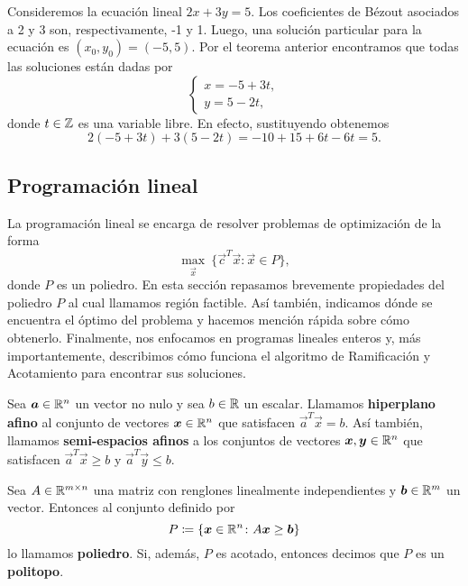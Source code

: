 \begin{example}
	Consideremos la ecuación lineal $2x + 3y = 5$. Los coeficientes de Bézout asociados a 2 y 3 son,
	respectivamente, -1 y 1. Luego, una solución particular para la ecuación es $(x_0, y_0) = (-5, 5)$.
	Por el teorema anterior encontramos que todas las soluciones están dadas por
	\begin{equation*}
		\begin{cases}
			x = -5 + 3t, \\
			y = 5 - 2t,
		\end{cases}
	\end{equation*}
	donde $t \in \mathbb{Z}$ es una variable libre. En efecto, sustituyendo obtenemos
	\begin{equation*}
		2(-5 + 3t) + 3(5 - 2t) = -10 + 15 + 6t - 6t = 5.
	\end{equation*}
\end{example}

\subsection{Programación lineal}
\label{subsec:lp}
\noindent
La programación lineal se encarga de resolver problemas de optimización de la forma
\begin{equation}
	\label{prim:lineal-opt}
	\max_{\vec{x}} ~\lbrace \vec{c}^T\vec{x} \colon \vec{x} \in P \rbrace,
\end{equation}
donde $P$ es un poliedro. En esta sección repasamos brevemente propiedades del poliedro $P$ al cual
llamamos región factible. Así también, indicamos dónde se encuentra el óptimo del problema y
hacemos mención rápida sobre cómo obtenerlo. Finalmente, nos enfocamos en programas lineales enteros
y, más importantemente, describimos cómo funciona el algoritmo de Ramificación y Acotamiento para
encontrar sus soluciones.

\begin{definition}
	Sea $\boldsymbol{a} \in \mathbb{R}^n$ un vector no nulo y sea $b \in \mathbb{R}$ un escalar. Llamamos
	\textbf{hiperplano afino}
	al conjunto de vectores $\boldsymbol{x} \in \mathbb{R}^n$ que satisfacen $\vec{a}^T\vec{x} = b$. Así también,
	llamamos \textbf{semi-espacios afinos} a los conjuntos de vectores $\boldsymbol{x}, \boldsymbol{y} \in \mathbb{R}^n$ que
	satisfacen $\vec{a}^T\vec{x} \geq b$ y $\vec{a}^T\vec{y} \leq b$.
\end{definition}

\begin{definition}
	Sea $A \in \mathbb{R}^{m \times n}$ una matriz con renglones linealmente independientes y $\boldsymbol{b} \in
	\mathbb{R}^m$ un vector. Entonces al conjunto definido por
	\begin{equation}
		\label{prerreq:def:poly}
		P \coloneq \lbrace \boldsymbol{x} \in \mathbb{R}^n \colon A\boldsymbol{x} \geq \boldsymbol{b} \rbrace
	\end{equation}
	lo llamamos \textbf{poliedro}. Si, además, $P$ es acotado, entonces decimos que $P$ es un
	\textbf{politopo}.
\end{definition}

